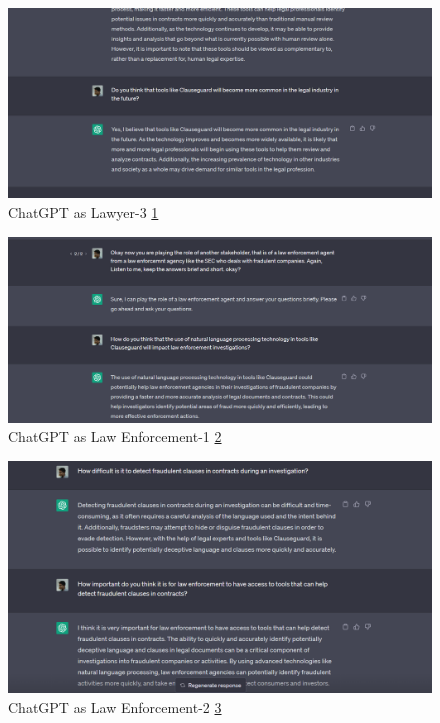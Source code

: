 \begin{itemize}
          \begin{figure}[H]
    \centering
    \includegraphics[scale=0.53]{Figures/gpt new 2 lawyer-3.png}
    \caption{ ChatGPT\cite{chatgpt} as Lawyer-3 \ref{fig::gpt new 2 lawyer-3}}
    \label{fig::gpt new 2 lawyer-3}
\end{figure}


          


          \begin{figure}[H]
    \centering
    \includegraphics[scale=0.53]{Figures/gpt 3 law enforcement-1.png}
    \caption{ ChatGPT\cite{chatgpt} as Law Enforcement-1 \ref{fig::gpt 3 law enforcement-1}}
    \label{fig::gpt 3 law enforcement-1}
\end{figure}


\begin{figure}[H]
    \centering
    \includegraphics[scale=0.53]{Figures/gpt 4 law enforcement.png}
    \caption{ ChatGPT\cite{chatgpt} as Law Enforcement-2 \ref{fig::gpt 4 law enforcement}}
    \label{fig::gpt 4 law enforcement}
\end{figure}


    \end{itemize}


